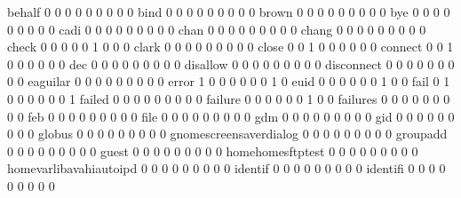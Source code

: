 \documentclass[compress,8pt]{beamer}
\begin{document}
\begin{frame}
\begin{Schunk}
  behalf                                     0   0   0   0   0   0   0   0   0
  bind                                       0   0   0   0   0   0   0   0   0
  brown                                      0   0   0   0   0   0   0   0   0
  bye                                        0   0   0   0   0   0   0   0   0
  cadi                                       0   0   0   0   0   0   0   0   0
  chan                                       0   0   0   0   0   0   0   0   0
  chang                                      0   0   0   0   0   0   0   0   0
  check                                      0   0   0   0   0   1   0   0   0
  clark                                      0   0   0   0   0   0   0   0   0
  close                                      0   0   1   0   0   0   0   0   0
  connect                                    0   0   1   0   0   0   0   0   0
  dec                                        0   0   0   0   0   0   0   0   0
  disallow                                   0   0   0   0   0   0   0   0   0
  disconnect                                 0   0   0   0   0   0   0   0   0
  eaguilar                                   0   0   0   0   0   0   0   0   0
  error                                      1   0   0   0   0   0   0   1   0
  euid                                       0   0   0   0   0   0   1   0   0
  fail                                       0   1   0   0   0   0   0   0   1
  failed                                     0   0   0   0   0   0   0   0   0
  failure                                    0   0   0   0   0   0   1   0   0
  failures                                   0   0   0   0   0   0   0   0   0
  feb                                        0   0   0   0   0   0   0   0   0
  file                                       0   0   0   0   0   0   0   0   0
  gdm                                        0   0   0   0   0   0   0   0   0
  gid                                        0   0   0   0   0   0   0   0   0
  globus                                     0   0   0   0   0   0   0   0   0
  gnomescreensaverdialog                     0   0   0   0   0   0   0   0   0
  groupadd                                   0   0   0   0   0   0   0   0   0
  guest                                      0   0   0   0   0   0   0   0   0
  homehomesftptest                           0   0   0   0   0   0   0   0   0
  homevarlibavahiautoipd                     0   0   0   0   0   0   0   0   0
  identif                                    0   0   0   0   0   0   0   0   0
  identifi                                   0   0   0   0   0   0   0   0   0

\end{Schunk}
\end{frame}
\end{document}
